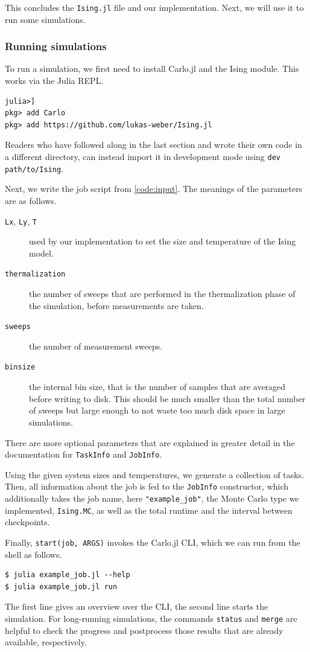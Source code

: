 \documentclass{SciPost}
\begin{document}
This concludes the \texttt{Ising.jl} file and our implementation. Next, we will use it to run some simulations.

\subsubsection{Running simulations}
\label{sec:runising}
To run a simulation, we first need to install Carlo.jl and the Ising module. This works via the Julia REPL.
\begin{lstlisting}
julia>]
pkg> add Carlo
pkg> add https://github.com/lukas-weber/Ising.jl
\end{lstlisting}
Readers who have followed along in the last section and wrote their own code in a different directory, can instead import it in development mode using \texttt{dev path/to/Ising}.

Next, we write the job script from \cref{code:input}. The meanings of the parameters are as follows.
\begin{description}
\item[\texttt{Lx}, \texttt{Ly}, \texttt{T}] used by our implementation to set the size and temperature of the Ising model.
\item[\texttt{thermalization}] the number of sweeps that are performed in the thermalization phase of the simulation, before measurements are taken.
\item[\texttt{sweeps}] the number of measurement sweeps.
\item[\texttt{binsize}] the internal bin size, that is the number of samples that are averaged before writing to disk. This should be much smaller than the total number of sweeps but large enough to not waste too much disk space in large simulations.
\end{description}
There are more optional parameters that are explained in greater detail in the documentation for \texttt{TaskInfo} and \texttt{JobInfo}.

Using the given system sizes and temperatures, we generate a collection of tasks. Then, all information about the job is fed to the \texttt{JobInfo} constructor, which additionally takes the job name, here \texttt{"example\_{}job"}, the Monte Carlo type we implemented, \texttt{Ising.MC}, as well as the total runtime and the interval between checkpoints.

Finally, \texttt{start(job, ARGS)} invokes the Carlo.jl CLI, which we can run from the shell as follows.
\begin{lstlisting}
$ julia example_job.jl --help
$ julia example_job.jl run
\end{lstlisting}
The first line gives an overview over the CLI, the second line starts the simulation.
For long-running simulations, the commands \texttt{status} and \texttt{merge} are helpful to check the progress and postprocess those results that are already available, respectively.
\end{document}
